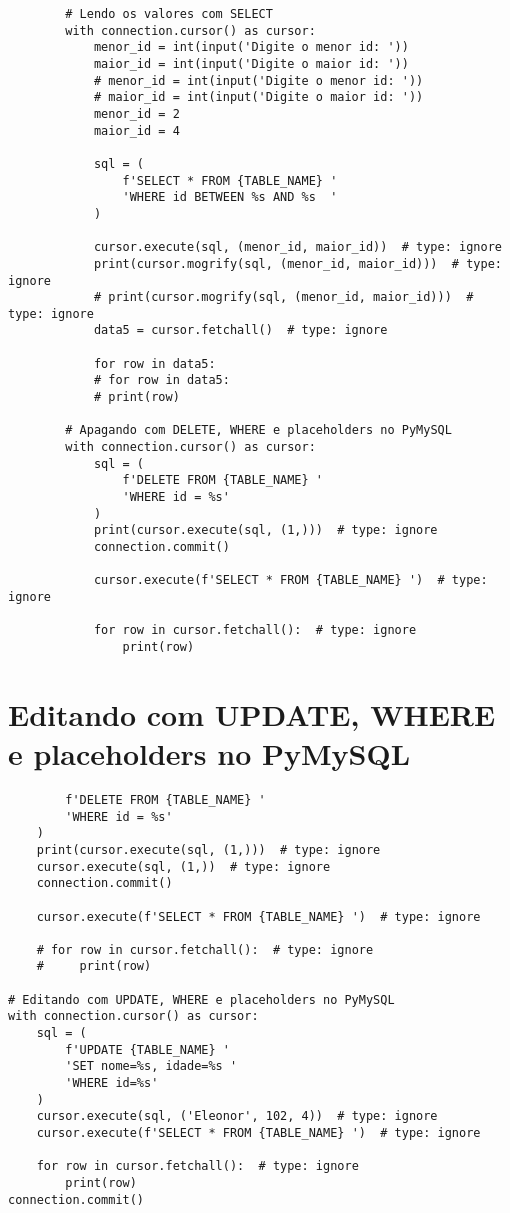 \documentclass{article}
\begin{document}
    \begin{lstlisting}
        # Lendo os valores com SELECT
        with connection.cursor() as cursor:
            menor_id = int(input('Digite o menor id: '))
            maior_id = int(input('Digite o maior id: '))
            # menor_id = int(input('Digite o menor id: '))
            # maior_id = int(input('Digite o maior id: '))
            menor_id = 2
            maior_id = 4
    
            sql = (
                f'SELECT * FROM {TABLE_NAME} '
                'WHERE id BETWEEN %s AND %s  '
            )
    
            cursor.execute(sql, (menor_id, maior_id))  # type: ignore
            print(cursor.mogrify(sql, (menor_id, maior_id)))  # type: ignore
            # print(cursor.mogrify(sql, (menor_id, maior_id)))  # type: ignore
            data5 = cursor.fetchall()  # type: ignore
    
            for row in data5:
            # for row in data5:
            # print(row)
    
        # Apagando com DELETE, WHERE e placeholders no PyMySQL
        with connection.cursor() as cursor:
            sql = (
                f'DELETE FROM {TABLE_NAME} '
                'WHERE id = %s'
            )
            print(cursor.execute(sql, (1,)))  # type: ignore
            connection.commit()
    
            cursor.execute(f'SELECT * FROM {TABLE_NAME} ')  # type: ignore
    
            for row in cursor.fetchall():  # type: ignore
                print(row)
    \end{lstlisting}

    \section{Editando com UPDATE, WHERE e placeholders no PyMySQL}
    
    \begin{lstlisting}
        f'DELETE FROM {TABLE_NAME} '
        'WHERE id = %s'
    )
    print(cursor.execute(sql, (1,)))  # type: ignore
    cursor.execute(sql, (1,))  # type: ignore
    connection.commit()

    cursor.execute(f'SELECT * FROM {TABLE_NAME} ')  # type: ignore

    # for row in cursor.fetchall():  # type: ignore
    #     print(row)

# Editando com UPDATE, WHERE e placeholders no PyMySQL
with connection.cursor() as cursor:
    sql = (
        f'UPDATE {TABLE_NAME} '
        'SET nome=%s, idade=%s '
        'WHERE id=%s'
    )
    cursor.execute(sql, ('Eleonor', 102, 4))  # type: ignore
    cursor.execute(f'SELECT * FROM {TABLE_NAME} ')  # type: ignore

    for row in cursor.fetchall():  # type: ignore
        print(row)
connection.commit()
    \end{lstlisting}
\end{document}
